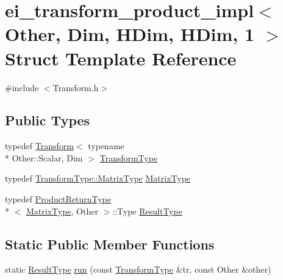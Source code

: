 \hypertarget{structei__transform__product__impl_3_01_other_00_01_dim_00_01_h_dim_00_01_h_dim_00_011_01_4}{\section{ei\-\_\-transform\-\_\-product\-\_\-impl$<$ Other, Dim, H\-Dim, H\-Dim, 1 $>$ Struct Template Reference}
\label{structei__transform__product__impl_3_01_other_00_01_dim_00_01_h_dim_00_01_h_dim_00_011_01_4}
}


{\ttfamily \#include $<$Transform.\-h$>$}

\subsection*{Public Types}
\begin{DoxyCompactItemize}
\item 
typedef \hyperlink{class_transform}{Transform}$<$ typename \\*
Other\-::\-Scalar, Dim $>$ \hyperlink{structei__transform__product__impl_3_01_other_00_01_dim_00_01_h_dim_00_01_h_dim_00_011_01_4_aa0784fb938b28060e4a3f35e6a66dce0}{Transform\-Type}
\item 
typedef \hyperlink{class_transform_afcdb9f1ab6b63ddfbc52789ef6319f33}{Transform\-Type\-::\-Matrix\-Type} \hyperlink{structei__transform__product__impl_3_01_other_00_01_dim_00_01_h_dim_00_01_h_dim_00_011_01_4_ac7971ccd8b146d3dc210fdf19d8ebaee}{Matrix\-Type}
\item 
typedef \hyperlink{struct_product_return_type}{Product\-Return\-Type}\\*
$<$ \hyperlink{structei__transform__product__impl_3_01_other_00_01_dim_00_01_h_dim_00_01_h_dim_00_011_01_4_ac7971ccd8b146d3dc210fdf19d8ebaee}{Matrix\-Type}, Other $>$\-::Type \hyperlink{structei__transform__product__impl_3_01_other_00_01_dim_00_01_h_dim_00_01_h_dim_00_011_01_4_aa0c217289404a840ac600f05a886dbc3}{Result\-Type}
\end{DoxyCompactItemize}
\subsection*{Static Public Member Functions}
\begin{DoxyCompactItemize}
\item 
static \hyperlink{structei__transform__product__impl_3_01_other_00_01_dim_00_01_h_dim_00_01_h_dim_00_011_01_4_aa0c217289404a840ac600f05a886dbc3}{Result\-Type} \hyperlink{structei__transform__product__impl_3_01_other_00_01_dim_00_01_h_dim_00_01_h_dim_00_011_01_4_a209ad2dc884579cbdc04c2e67215a1a5}{run} (const \hyperlink{structei__transform__product__impl_3_01_other_00_01_dim_00_01_h_dim_00_01_h_dim_00_011_01_4_aa0784fb938b28060e4a3f35e6a66dce0}{Transform\-Type} \&tr, const Other \&other)
\end{DoxyCompactItemize}


